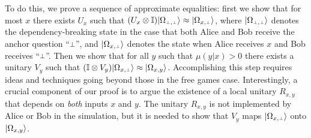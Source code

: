 To do this, we prove a sequence of approximate equalities: first we show that for most $x$ there exists $U_x$ such that $(U_x \otimes \Id) \ket{\Omega_{\dummy, \dummy}} \approx \ket{\Omega_{x,\dummy}}$, where $\ket{\Omega_{\dummy, \dummy}}$ denotes the dependency-breaking state in the case that both Alice and Bob receive the anchor question ``$\dummy$'', and $\ket{\Omega_{x,\dummy}}$ denotes the state when Alice receives $x$ and Bob receives ``$\dummy$''. Then we show that for all $y$ such that $\mu(y | x) > 0$ there exists a unitary $V_y$ such that $(\Id \otimes V_y) \ket{\Omega_{x,\dummy}} \approx \ket{\Omega_{x,y}}$. Accomplishing this step requires ideas and techniques going beyond those in the free games case. Interestingly, a crucial component of our proof is to argue the existence of a local unitary $R_{x,y}$ that depends on \emph{both} inputs $x$ and $y$. The unitary $R_{x,y}$ is not implemented by Alice or Bob in the simulation, but it is needed to show that $V_y$ maps $\ket{\Omega_{x,\dummy}}$ onto ${|\Omega_{x,y}\rangle}$. 